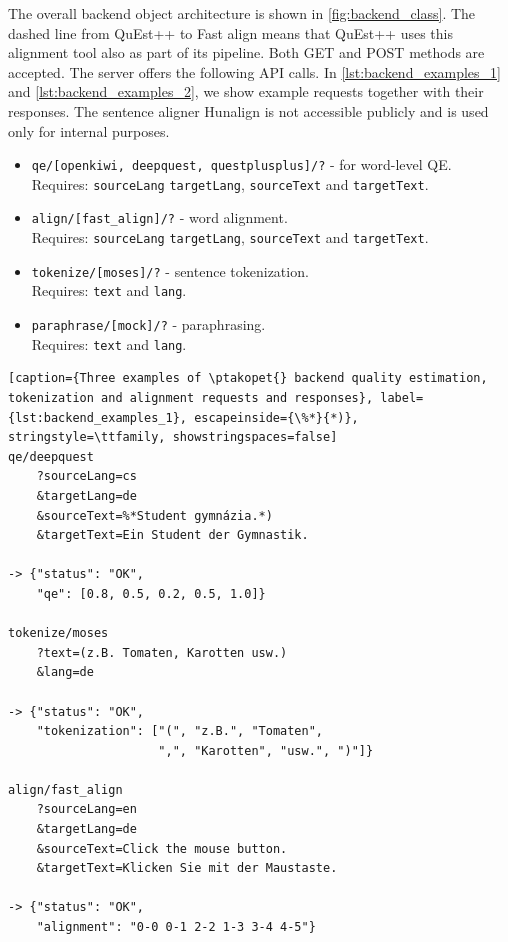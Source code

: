 The overall backend object architecture is shown in \cref{fig:backend_class}. The dashed line from QuEst++ to Fast align means that QuEst++ uses this alignment tool also as part of its pipeline. Both GET and POST methods are accepted. The server offers the following API calls. In \cref{lst:backend_examples_1} and \cref{lst:backend_examples_2}, we show example requests together with their responses. The sentence aligner Hunalign is not accessible publicly and is used only for internal purposes.


\begin{itemize}
    \item \texttt{qe/[openkiwi, deepquest, questplusplus]/?} - for word-level QE. \\
    Requires: \texttt{sourceLang} \texttt{targetLang}, \texttt{sourceText} and \texttt{targetText}.
    
    \item \texttt{align/[fast\_align]/?} - word alignment. \\
    Requires: \texttt{sourceLang} \texttt{targetLang}, \texttt{sourceText} and \texttt{targetText}.
    
    \item \texttt{tokenize/[moses]/?} - sentence tokenization. \\
    Requires: \texttt{text} and \texttt{lang}.
    
    \item \texttt{paraphrase/[mock]/?} - paraphrasing. \\
    Requires: \texttt{text} and \texttt{lang}.
\end{itemize}


\begin{lstlisting}[caption={Three examples of \ptakopet{} backend quality estimation, tokenization and alignment requests and responses}, label={lst:backend_examples_1}, escapeinside={\%*}{*)}, stringstyle=\ttfamily, showstringspaces=false]
qe/deepquest
    ?sourceLang=cs
    &targetLang=de
    &sourceText=%*Student gymnázia.*)
    &targetText=Ein Student der Gymnastik.
    
-> {"status": "OK", 
    "qe": [0.8, 0.5, 0.2, 0.5, 1.0]}

tokenize/moses
    ?text=(z.B. Tomaten, Karotten usw.)
    &lang=de
    
-> {"status": "OK",
    "tokenization": ["(", "z.B.", "Tomaten",
                     ",", "Karotten", "usw.", ")"]}
               
align/fast_align
    ?sourceLang=en
    &targetLang=de
    &sourceText=Click the mouse button.
    &targetText=Klicken Sie mit der Maustaste.
    
-> {"status": "OK",
    "alignment": "0-0 0-1 2-2 1-3 3-4 4-5"}
\end{lstlisting}
               

